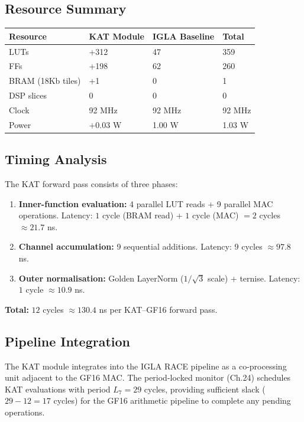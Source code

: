 \subsection{Resource Summary}

\begin{longtable}[]{@{}llll@{}}
\toprule\noalign{}
Resource & KAT Module & IGLA Baseline & Total \\
\midrule\noalign{}
\endhead
\bottomrule\noalign{}
\endlastfoot
LUTs & +312 & 47 & 359 \\
FFs & +198 & 62 & 260 \\
BRAM (18Kb tiles) & +1 & 0 & 1 \\
DSP slices & 0 & 0 & 0 \\
Clock & 92 MHz & 92 MHz & 92 MHz \\
Power & $+0.03$ W & 1.00 W & 1.03 W \\
\end{longtable}

\subsection{Timing Analysis}

The KAT forward pass consists of three phases:

\begin{enumerate}
\item \textbf{Inner-function evaluation:} 4 parallel LUT reads + 9
parallel MAC operations. Latency: $1$ cycle (BRAM read) + $1$ cycle
(MAC) $= 2$ cycles $\approx 21.7$ ns.
\item \textbf{Channel accumulation:} 9 sequential additions. Latency:
$9$ cycles $\approx 97.8$ ns.
\item \textbf{Outer normalisation:} Golden LayerNorm ($1/\sqrt{3}$
scale) + ternise. Latency: $1$ cycle $\approx 10.9$ ns.
\end{enumerate}

\textbf{Total:} $12$ cycles $\approx 130.4$ ns per KAT--GF16 forward
pass.

\subsection{Pipeline Integration}

The KAT module integrates into the IGLA RACE pipeline as a co-processing
unit adjacent to the GF16 MAC. The period-locked monitor (Ch.24)
schedules KAT evaluations with period $L_7 = 29$ cycles, providing
sufficient slack ($29 - 12 = 17$ cycles) for the GF16 arithmetic
pipeline to complete any pending operations.

